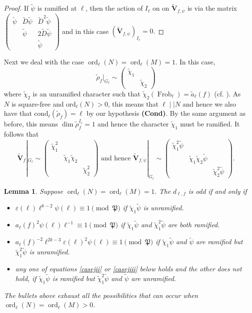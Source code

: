 \documentclass{amsart}
\newcommand{\bV}{\mathbf{V}}
\newcommand{\Frob}{\operatorname{Frob}}
\newcommand{\ord}{\operatorname{ord}}
\newtheorem{auxiliary proposition}[theorem]{Auxiliary Proposition}
\newtheorem{lemma}[theorem]{Lemma}
\newtheorem{main conjecture}[theorem]{Main Conjecture}
\newtheorem{main theorem}[theorem]{Main Theorem}
\newtheorem{modesty proposition}[theorem]{Modesty Proposition}
\newtheorem{open problem}[theorem]{Open Problem}
\newtheorem{convergence lemma}[theorem]{Convergence Lemma}
\newtheorem{corrected lemma}[theorem]{Corrected Lemma}
\newtheorem{growth lemma}[theorem]{Growth Lemma}
\newtheorem{coefficient lemma}[theorem]{Integrality Lemma}
\newtheorem{interpolation lemma}[theorem]{Interpolation Lemma}
\newtheorem{kernel lemma}[theorem]{Kernel Lemma}
\newtheorem{limit lemma}[theorem]{Limit Lemma}
\newtheorem{tandem lemma}[theorem]{Modesty Lemma}
\newtheorem{zero-finding lemma}[theorem]{Zero-Finding Lemma}
\begin{document}
\begin{proof}
If $\tilde{\psi}$ is ramified at $\ell$, then
the action of $I_\ell$ on on $\tilde{\bV}_{f,\psi}$ is via the matrix 
$\begin{pmatrix}
\tilde{\psi} & \tilde{D}\tilde{\psi} & \tilde{D}^2\tilde{\psi}\\
~ & \tilde{\psi} & 2\tilde{D}\tilde{\psi}\\
~ & ~ & \tilde{\psi}
\end{pmatrix}$
and in this case $(\tilde{\bV}_{f,\psi})_{I_\ell}=0.$
\end{proof}
Next we deal with the case $\ord_\ell(N)=\ord_\ell(M)=1$.
In this case,  $$\tilde{\rho}_f|_{G_\ell}\sim \begin{pmatrix}
\tilde{\chi}_1 & ~ \\
~ & \tilde{\chi}_2
\end{pmatrix}$$
where $\tilde{\chi}_2$ is an unramified character such that $\tilde{\chi}_2(\Frob_\ell)=\tilde{a}_\ell(f)$ (cf. \cite[Theorem 3.26(3a)]{HidabookModular}). As $N$ is square-free and $\mathrm{ord}_\ell(N)>0$, this means that $\ell \mid \mid N$ and hence we also have that 
$\mathrm{cond}_\ell(\tilde{\rho}_f)=\ell $ by our hypothesis \textbf{(Cond)}. By the same argument as before, this means $\dim \tilde{\rho}_f^{I_\ell}=1$ 
and hence the character $\tilde{\chi}_1$ must be 
ramified.
It follows that 
$$\tilde{\bV}_f|_{G_\ell}\sim \begin{pmatrix}
\tilde{\chi}_1^2 & ~ & ~\\
~ & \tilde{\chi}_1\tilde{\chi}_2 & ~\\
~ & ~ & \tilde{\chi}_2^2
\end{pmatrix}
\text{ and hence }
\tilde{\bV}_{f,\psi}|_{G_\ell}\sim \begin{pmatrix}
\tilde{\chi}_1^2\tilde{\psi} & ~ & ~\\
~ & \tilde{\chi}_1\tilde{\chi}_2\tilde{\psi} & ~\\
~ & ~ & \tilde{\chi}_2^2\tilde{\psi}
\end{pmatrix}.
$$
\begin{lemma}\label{lem: iii}
Suppose $\ord_\ell(N)=\ord_\ell(M)=1$. The $d_{\ell,f}$ is odd if and only if 
\begin{itemize}
      \item  $\varepsilon(\ell)\ell^{k-2}\psi(\ell)\equiv 1 \pmod{\mathfrak{P}}$ if $\tilde{\chi}_1\tilde{\psi}$ is unramified.
      \item $a_\ell(f)^2\psi(\ell) \ell^{-1} \equiv 1 \pmod{\mathfrak{P}}$ if $\tilde{\chi}_1\tilde{\psi}$ and $\tilde{\chi}_1^2\tilde{\psi}$ are both ramified.
      \item ${a}_\ell(f)^{-2}{\ell}^{2k-3}{\varepsilon}(\ell)^2{\psi}(\ell) \equiv 1 \pmod{\mathfrak{P}}$ if $\tilde{\chi}_1\tilde{\psi}$ and $\tilde{\psi}$ are ramified  but $\tilde{\chi}_1^2\tilde{\psi}$ is unramified.
      \item any one of equations \eqref{casejii} or \eqref{casejiii} below holds and the other does not hold, if $\tilde{\chi}_1\tilde{\psi}$ is ramified  but $\tilde{\chi}_1^2\tilde{\psi}$ and $\tilde{\psi}$ are unramified.
\end{itemize}
The bullets above exhaust all the possibilities that can occur when $\ord_\ell(N)=\ord_\ell(M)>0$.
\end{lemma}
\end{document}
